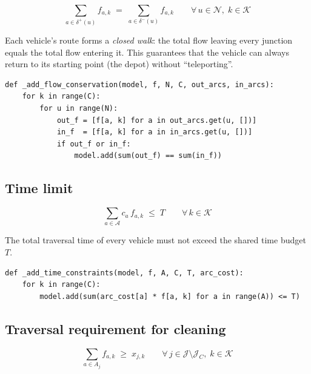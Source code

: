 \documentclass[11pt]{article}
\newcommand{\setN}{\mathcal{N}}   %
\newcommand{\setA}{\mathcal{A}}   %
\newcommand{\setJ}{\mathcal{J}}   %
\newcommand{\setK}{\mathcal{K}}   %
\newcommand{\Jc}{\mathcal{J}_C}   %
\newcommand{\Aj}{A_j}             %
\begin{document}
\begin{equation}\label{eq:flow}
\sum_{a \in \delta^+(u)} f_{a,k}
\;=\;
\sum_{a \in \delta^-(u)} f_{a,k}
\qquad \forall\, u \in \setN,\; k \in \setK
\end{equation}

Each vehicle's route forms a \emph{closed walk}: the total flow leaving
every junction equals the total flow entering it.  This guarantees that the
vehicle can always return to its starting point (the depot) without
``teleporting''.

\begin{lstlisting}[caption={Constraint~(\ref{eq:flow}): Flow conservation}]
def _add_flow_conservation(model, f, N, C, out_arcs, in_arcs):
    for k in range(C):
        for u in range(N):
            out_f = [f[a, k] for a in out_arcs.get(u, [])]
            in_f  = [f[a, k] for a in in_arcs.get(u, [])]
            if out_f or in_f:
                model.add(sum(out_f) == sum(in_f))
\end{lstlisting}

\subsection{Time limit}

\begin{equation}\label{eq:time}
\sum_{a \in \setA} c_a \, f_{a,k} \;\le\; T
\qquad \forall\, k \in \setK
\end{equation}

The total traversal time of every vehicle must not exceed the shared time
budget~$T$.

\begin{lstlisting}[caption={Constraint~(\ref{eq:time}): Time limit}]
def _add_time_constraints(model, f, A, C, T, arc_cost):
    for k in range(C):
        model.add(sum(arc_cost[a] * f[a, k] for a in range(A)) <= T)
\end{lstlisting}

\subsection{Traversal requirement for cleaning}

\begin{equation}\label{eq:traverse}
\sum_{a \in \Aj} f_{a,k} \;\ge\; x_{j,k}
\qquad \forall\, j \in \setJ \setminus \Jc,\; k \in \setK
\end{equation}
\end{document}
